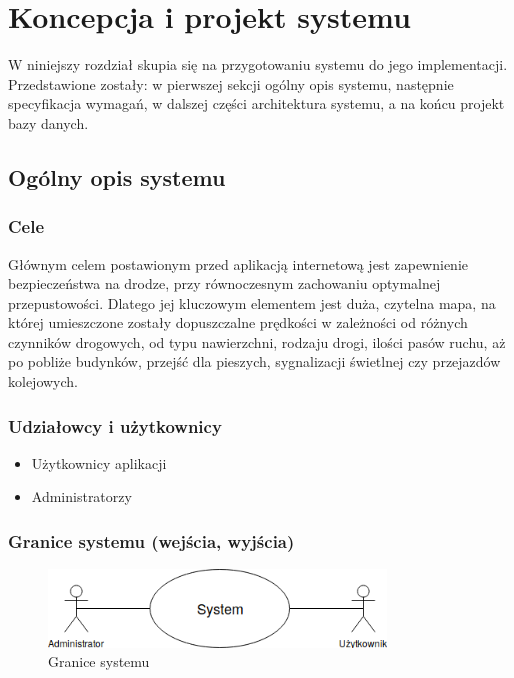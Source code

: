 \chapter{Koncepcja i projekt systemu}
\label{cha:konception}

W niniejszy rozdział skupia się na przygotowaniu systemu do jego implementacji. Przedstawione zostały: w pierwszej sekcji ogólny opis systemu, następnie specyfikacja wymagań, w dalszej części architektura systemu, a na końcu projekt bazy danych.

\section{Ogólny opis systemu}

\subsection{Cele}
Głównym celem postawionym przed aplikacją internetową jest zapewnienie bezpieczeństwa na drodze, przy równoczesnym zachowaniu optymalnej przepustowości. Dlatego jej kluczowym elementem jest duża, czytelna mapa, na której umieszczone zostały dopuszczalne prędkości w zależności od różnych czynników drogowych, od typu nawierzchni, rodzaju drogi, ilości pasów ruchu, aż po pobliże budynków, przejść dla pieszych, sygnalizacji świetlnej czy przejazdów kolejowych. 

\subsection{Udziałowcy i użytkownicy}
\begin{itemize}
\item Użytkownicy aplikacji
\item Administratorzy
\end{itemize}

\subsection{Granice systemu (wejścia, wyjścia)}

\begin{figure}[h]
\caption{Granice systemu}
\label{sec:inOutBorder}
\centering
\includegraphics[width=0.8\textwidth]{inOutBorder}
\end{figure}


